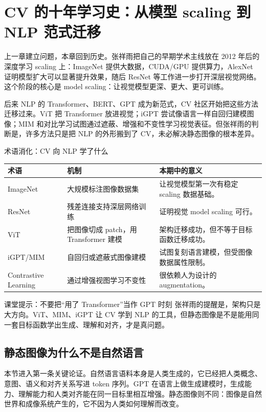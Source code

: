 \section{CV 的十年学习史：从模型 scaling 到 NLP 范式迁移}

上一章建立问题，本章回到历史。张祥雨把自己的早期学术主线放在 2012 年后的深度学习 scaling 上：ImageNet 提供大数据，CUDA/GPU 提供算力，AlexNet 证明模型扩大可以显著提升效果，随后 ResNet 等工作进一步打开深层视觉网络。这个阶段的核心是 model scaling：让视觉模型更深、更大、更可训练。

后来 NLP 的 Transformer、BERT、GPT 成为新范式，CV 社区开始把这些方法迁移过来。ViT 把 Transformer 放进视觉；iGPT 尝试像语言一样自回归建模图像；MIM 和对比学习试图通过遮蔽、增强和不变性学习视觉表征。但张祥雨的判断是，许多方法只是把 NLP 的外形搬到了 CV，未必解决静态图像的根本差异。

\begin{knowledgebox}{术语消化：CV 向 NLP 学了什么}
\noindent\begin{tabularx}{\textwidth}{p{}p{}X}
\toprule
术语 & 机制 & 本期中的意义 \\
\midrule
ImageNet & 大规模标注图像数据集 & 让视觉模型第一次有稳定 scaling 数据基础。 \\
ResNet & 残差连接支持深层网络训练 & 证明视觉 model scaling 可行。 \\
ViT & 把图像切成 patch，用 Transformer 建模 & 架构迁移成功，但不等于目标函数迁移成功。 \\
iGPT/MIM & 自回归或遮蔽式图像建模 & 试图复刻语言建模，但受图像数据属性限制。 \\
Contrastive Learning & 通过增强视图学习不变性 & 很依赖人为设计的 augmentation。 \\
\bottomrule
\end{tabularx}
\end{knowledgebox}

\begin{warningbox}{课堂提示：不要把“用了 Transformer”当作 GPT 时刻}
张祥雨的提醒是，架构只是大方向。ViT、MIM、iGPT 让 CV 学到 NLP 的工具，但静态图像是不是能用同一套目标函数学出生成、理解和对齐，才是真问题。
\end{warningbox}

\subsection{静态图像为什么不是自然语言}

本节进入第一条关键论证。自然语言语料本身是人类生成的，它已经把人类概念、意图、语义和对齐关系写进 token 序列。GPT 在语言上做生成建模时，生成能力、理解能力和人类对齐能在同一目标里相互增强。静态图像则不同：图像是自然世界和成像系统产生的，它不因为人类如何理解而改变。

